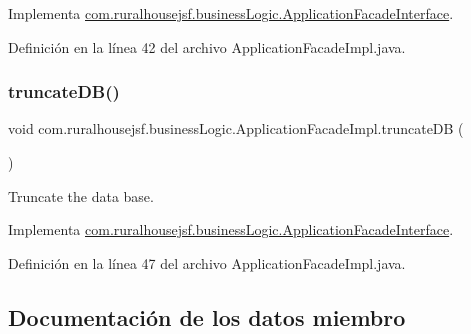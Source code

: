 Implementa \mbox{\hyperlink{interfacecom_1_1ruralhousejsf_1_1business_logic_1_1_application_facade_interface_a8bb95aa007a4d95b32ed838ae40406c0}{com.\+ruralhousejsf.\+business\+Logic.\+Application\+Facade\+Interface}}.



Definición en la línea 42 del archivo Application\+Facade\+Impl.\+java.

\mbox{\label{classcom_1_1ruralhousejsf_1_1business_logic_1_1_application_facade_impl_a5fe9f44c95b3459fb8999c26e5b934cb}} 
\subsubsection{\texorpdfstring{truncateDB()}{truncateDB()}}
{\footnotesize\ttfamily void com.\+ruralhousejsf.\+business\+Logic.\+Application\+Facade\+Impl.\+truncate\+DB (\begin{DoxyParamCaption}{ }\end{DoxyParamCaption})}



Truncate the data base. 



Implementa \mbox{\hyperlink{interfacecom_1_1ruralhousejsf_1_1business_logic_1_1_application_facade_interface_aeb85aa3c5dd08bc15e08cc0d4c36882e}{com.\+ruralhousejsf.\+business\+Logic.\+Application\+Facade\+Interface}}.



Definición en la línea 47 del archivo Application\+Facade\+Impl.\+java.



\subsection{Documentación de los datos miembro}
\mbox{\label{classcom_1_1ruralhousejsf_1_1business_logic_1_1_application_facade_impl_a96ac80fe606a4649e5fbbbd24935690a}} 
